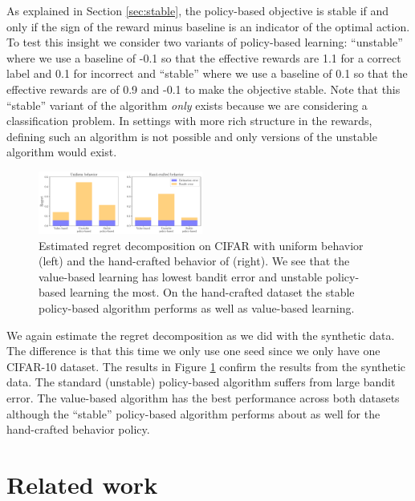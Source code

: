 As explained in Section \ref{sec:stable}, the policy-based objective is stable if and only if the sign of the reward minus baseline is an indicator of the optimal action. To test this insight we consider two variants of policy-based learning: ``unstable'' where we use a baseline of -0.1 so that the effective rewards are 1.1 for a correct label and 0.1 for incorrect and ``stable'' where we use a baseline of 0.1 so that the effective rewards are of 0.9 and -0.1 to make the objective stable. Note that this ``stable'' variant of the algorithm \emph{only} exists because we are considering a classification problem. In settings with more rich structure in the rewards, defining such an algorithm is not possible and only versions of the unstable algorithm would exist.

\begin{figure}
    \centering
    \includegraphics[width=0.48\textwidth]{figures/offline-bandits/cifar_regret_bar.pdf}
    \caption{Estimated regret decomposition on CIFAR with uniform behavior (left) and the hand-crafted behavior of \citet{joachims2018deep} (right). We see that the value-based learning has lowest bandit error and unstable policy-based learning the most. On the hand-crafted dataset the stable policy-based algorithm performs as well as value-based learning.}
    \label{fig:cifar_regret}
\end{figure}

We again estimate the regret decomposition as we did with the synthetic data. The difference is that this time we only use one seed since we only have one CIFAR-10 dataset. The results in Figure \ref{fig:cifar_regret} confirm the results from the synthetic data. The standard (unstable) policy-based algorithm suffers from large bandit error. The value-based algorithm has the best performance across both datasets although the ``stable'' policy-based algorithm performs about as well for the hand-crafted behavior policy.

\section{Related work}\label{sec:related}


